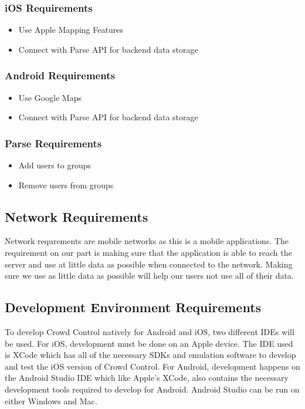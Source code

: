 \subsubsection{iOS Requirements}
\begin{itemize}
\item{Use Apple Mapping Features}
\item{Connect with Parse API for backend data storage}
\end{itemize}
\subsubsection{Android Requirements}
\begin{itemize}
\item{Use Google Maps}
\item{Connect with Parse API for backend data storage}
\end{itemize}
\subsubsection{Parse Requirements}
\begin{itemize}
\item{Add users to groups}
\item{Remove users from groups}
\end{itemize}

\subsection{Network Requirements}

Network requrements are mobile networks as this is a mobile applications. The requirement on our part is making sure that the application is able to reach the server and use at little data as possible when connected to the network. Making sure we use as little data as possible will help our users not use all of their data. 

\subsection{Development Environment Requirements}
To develop Crowd Control natively for Android and iOS, two different IDEs will be used.  For iOS, development must be done on an Apple device.  The IDE used is XCode which has all of the necessary SDKs and emulation software to develop and test the iOS version of Crowd Control.  For Android, development happens on the Android Studio IDE which like Apple's XCode, also contains the necessary development tools required to develop for Android.  Android Studio can be run on either  Windows and Mac. 


